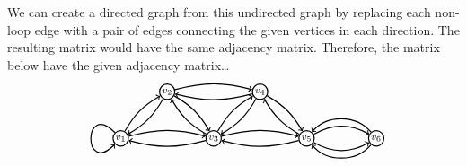\documentclass[11pt,letterpaper]{article}
\begin{document}
We can create a directed graph from this undirected graph by replacing each non-loop edge with a pair of edges connecting the given vertices in each direction. The resulting matrix would have the same adjacency matrix. Therefore, the matrix below have the given adjacency matrix\dots
	\[
	\begin{tikzpicture}[scale=1.3]
	\node[draw,inner sep=1pt,minimum size=2pt,line width=0.03cm,circle] at (0, 0)   (a) {\footnotesize$v_1$};
	\node[draw,inner sep=1pt,minimum size=2pt,line width=0.03cm,circle] at (1, 1)   (b) {\footnotesize$v_2$};
	\node[draw,inner sep=1pt,minimum size=2pt,line width=0.03cm,circle] at (2, 0)   (c) {\footnotesize$v_3$};
	\node[draw,inner sep=1pt,minimum size=2pt,line width=0.03cm,circle] at (3, 1)   (d) {\footnotesize$v_4$};
	\node[draw,inner sep=1pt,minimum size=2pt,line width=0.03cm,circle] at (4, 0)   (e) {\footnotesize$v_5$};
	\node[draw,inner sep=1pt,minimum size=2pt,line width=0.03cm,circle] at (5.5, 0)   (f) {\footnotesize$v_6$};

	\path[line width=0.03cm,out=135,in=225,looseness=10,->] (a) edge (a);
	
	\path[line width=0.03cm,bend left=15,->] (a) edge (b);
	\path[line width=0.03cm,bend left=15,->] (b) edge (a);
	
	\path[line width=0.03cm,bend left=15,->] (a) edge (c);
	\path[line width=0.03cm,bend left=15,->] (c) edge (a);
	
	\path[line width=0.03cm,bend left=15,->] (b) edge (c);
	\path[line width=0.03cm,bend left=15,->] (c) edge (b);
	
	\path[line width=0.03cm,bend left=15,->] (b) edge (d);
	\path[line width=0.03cm,bend left=15,->] (d) edge (b);
	
	\path[line width=0.03cm,bend left=15,->] (c) edge (d);
	\path[line width=0.03cm,bend left=15,->] (d) edge (c);
	
	\path[line width=0.03cm,bend left=15,->] (c) edge (e);
	\path[line width=0.03cm,bend left=15,->] (e) edge (c);
	
	\path[line width=0.03cm,bend left=15,->] (d) edge (e);
	\path[line width=0.03cm,bend left=15,->] (e) edge (d);
	
	\path[line width=0.03cm, bend left=30,->] (e) edge (f);
	\path[line width=0.03cm, bend left=50,->] (f) edge (e);
	
	\path[line width=0.03cm, bend right=30,->] (e) edge (f);
	\path[line width=0.03cm, bend right=50,->] (f) edge (e);
	\end{tikzpicture}
	\]
\end{document}

